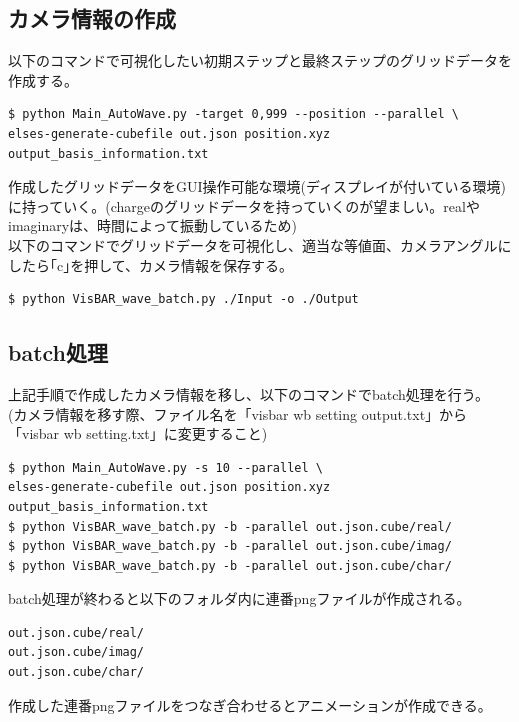 \documentclass{jsarticle}
\begin{document}
\subsection{カメラ情報の作成}
以下のコマンドで可視化したい初期ステップと最終ステップのグリッドデータを作成する。\\
\begin{Verbatim}[frame=single]
$ python Main_AutoWave.py -target 0,999 --position --parallel \
elses-generate-cubefile out.json position.xyz output_basis_information.txt
\end{Verbatim}
作成したグリッドデータをGUI操作可能な環境(ディスプレイが付いている環境)に持っていく。(chargeのグリッドデータを持っていくのが望ましい。realやimaginaryは、時間によって振動しているため)\\
以下のコマンドでグリッドデータを可視化し、適当な等値面、カメラアングルにしたら｢c｣を押して、カメラ情報を保存する。
\begin{Verbatim}[frame=single]
$ python VisBAR_wave_batch.py ./Input -o ./Output
\end{Verbatim}

\subsection{batch処理}
上記手順で作成したカメラ情報を移し、以下のコマンドでbatch処理を行う。\\
(カメラ情報を移す際、ファイル名を「visbar wb setting output.txt」から「visbar wb setting.txt」に変更すること)\\
\begin{Verbatim}[frame=single]
$ python Main_AutoWave.py -s 10 --parallel \
elses-generate-cubefile out.json position.xyz output_basis_information.txt
$ python VisBAR_wave_batch.py -b -parallel out.json.cube/real/
$ python VisBAR_wave_batch.py -b -parallel out.json.cube/imag/
$ python VisBAR_wave_batch.py -b -parallel out.json.cube/char/
\end{Verbatim}
batch処理が終わると以下のフォルダ内に連番pngファイルが作成される。\\
\begin{Verbatim}[frame=single]
out.json.cube/real/
out.json.cube/imag/
out.json.cube/char/
\end{Verbatim}

作成した連番pngファイルをつなぎ合わせるとアニメーションが作成できる。\\
\end{document}
